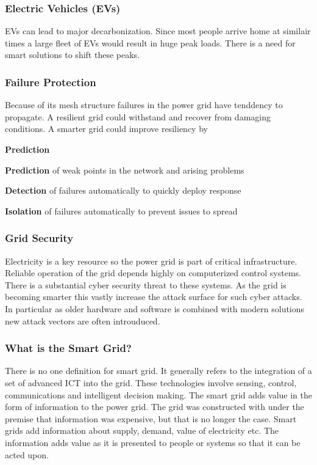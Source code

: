 \subsubsection{Electric Vehicles (EVs)}
EVs can lead to major decarbonization.
Since most people arrive home at similair times a large fleet of EVs would result in huge peak loads.
There is a need for smart solutions to shift these peaks.

\subsubsection{Failure Protection}
Because of its mesh structure failures in the power grid have tenddency to propagate.
A resilient grid could withstand and recover from damaging conditions.
A smarter grid could improve resiliency by
\begin{labeling}{\textbf{Prediction}}
    \item [\textbf{Prediction}] of weak points in the network and arising problems
    \item [\textbf{Detection}] of failures automatically to quickly deploy response
    \item [\textbf{Isolation}] of failures automatically to prevent issues to spread
\end{labeling}

\subsubsection{Grid Security}
Electricity is a key resource so the power grid is part of critical infrastructure.
Reliable operation of the grid depends highly on computerized control systems.
There is a substantial cyber security threat to these systems.
As the grid is becoming smarter this vastly increase the attack surface for such cyber attacks.
In particular as older hardware and software is combined with modern solutions new attack vectors are often introuduced.

\subsubsection{What is the Smart Grid?}
There is no one definition for smart grid.
It generally refers to the integration of a set of advanced ICT into the grid.
These technologies involve sensing, control, communications and intelligent decision making.
The smart grid adds value in the form of information to the power grid.
The grid was constructed with under the premise that information was expensive, but that is no longer the case.
Smart grids add information about supply, demand, value of electricity etc.
The information adds value as it is presented to people or systems so that it can be acted upon.\\

